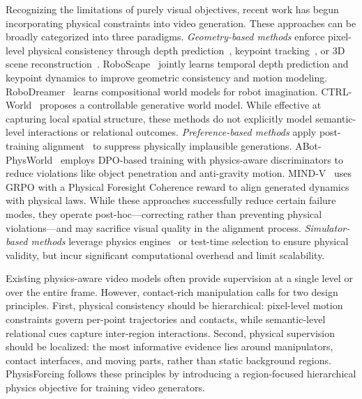 Recognizing the limitations of purely visual objectives, recent work has begun incorporating physical constraints into video generation. These approaches can be broadly categorized into three paradigms. \textit{Geometry-based methods} enforce pixel-level physical consistency through depth prediction~\cite{yang2024depth,video_depth_anything}, keypoint tracking~\cite{karaev2023cotracker,karaev24cotracker3,harley2025alltracker}, or 3D scene reconstruction~\cite{zhen2025tesseract}. RoboScape~\cite{shang2025roboscape} jointly learns temporal depth prediction and keypoint dynamics to improve geometric consistency and motion modeling. RoboDreamer~\cite{zhou2024robodreamer} learns compositional world models for robot imagination. CTRL-World~\cite{guo2025ctrl} proposes a controllable generative world model. While effective at capturing local spatial structure, these methods do not explicitly model semantic-level interactions or relational outcomes. \textit{Preference-based methods} apply post-training alignment~\cite{ouyang2022training,rafailov2024direct} to suppress physically implausible generations. ABot-PhysWorld~\cite{ali2025abot} employs DPO-based training with physics-aware discriminators to reduce violations like object penetration and anti-gravity motion. MIND-V~\cite{zhang2026mind} uses GRPO with a Physical Foresight Coherence reward to align generated dynamics with physical laws. While these approaches successfully reduce certain failure modes, they operate post-hoc—correcting rather than preventing physical violations—and may sacrifice visual quality in the alignment process. \textit{Simulator-based methods} leverage physics engines~\cite{wang2023robogen,yang2025physics} or test-time selection to ensure physical validity, but incur significant computational overhead and limit scalability.

Existing physics-aware video models often provide supervision at a single level or over the entire frame. However, contact-rich manipulation calls for two design principles. First, physical consistency should be hierarchical: pixel-level motion constraints govern per-point trajectories and contacts, while semantic-level relational cues capture inter-region interactions. Second, physical supervision should be localized: the most informative evidence lies around manipulators, contact interfaces, and moving parts, rather than static background regions. PhysisForcing follows these principles by introducing a region-focused hierarchical physics objective for training video generators.